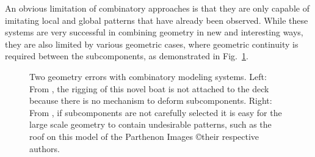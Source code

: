 An obvious limitation of combinatory approaches is that they are only capable of imitating local and global patterns that have already been observed.  While these systems are very successful in combining geometry in new and interesting ways, they are also limited by various geometric cases, where geometric continuity is required between the subcomponents, as demonstrated in Fig.~\ref{fig:combinErrors}.

\begin{figure}
\centering
\def\svgwidth{0.7\columnwidth}

\caption[Issues with combinatory Modeling]{\label{fig:combinErrors}Two geometry errors with combinatory modeling systems. Left: From \cite{Kalogerakis12}, the rigging of this novel boat is not attached to the deck because there is no mechanism to deform subcomponents. Right: From \cite{Lin11}, if subcomponents are not carefully selected it is easy for the large scale geometry to contain undesirable patterns, such as the roof on this model of the Parthenon Images \copyright their respective authors.}
\end{figure}





